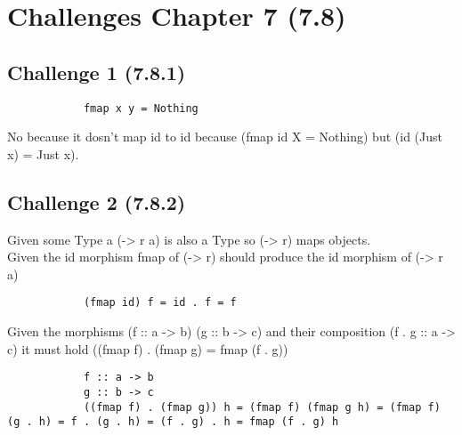 \documentclass[11pt]{article}
\begin{document}
\section*{Challenges Chapter 7 (7.8)}
    \subsection*{Challenge 1 (7.8.1)}

        \begin{verbatim}
            fmap x y = Nothing
        \end{verbatim}


        No because it dosn't map id to id because (fmap id X = Nothing) but (id (Just x) = Just x). 

    \subsection*{Challenge 2 (7.8.2)}

        Given some Type a (-> r a) is also a Type so (-> r) maps objects. \\
        Given the id morphism fmap of (-> r) should produce the id morphism of (-> r a) \\
        \begin{verbatim}
            (fmap id) f = id . f = f
        \end{verbatim}
        Given the morphisms (f :: a -> b) (g :: b -> c) and their composition (f . g :: a -> c) it must hold ((fmap f) . (fmap g) = fmap (f . g))
        \begin{verbatim}
            f :: a -> b
            g :: b -> c
            ((fmap f) . (fmap g)) h = (fmap f) (fmap g h) = (fmap f) (g . h) = f . (g . h) = (f . g) . h = fmap (f . g) h 
        \end{verbatim}
\end{document}
